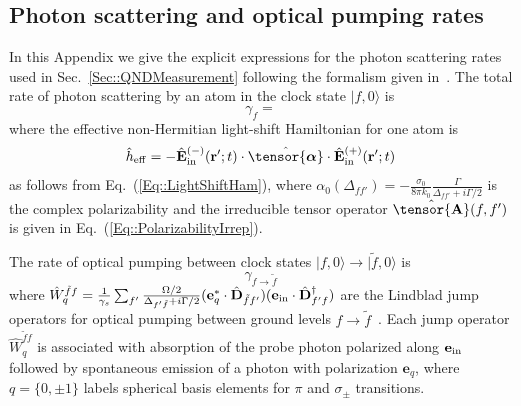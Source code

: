 \documentclass[preprint,aps,pra,onecolumn,superscriptaddress]{revtex4-1} %
\def\bra#1{\langle{#1}\rvert}%
\def\ket#1{\lvert{#1}\rangle}%
\newcommand{\erf}[1]{Eq.~(\ref{#1})}
\newcommand{\mbf}[1]{\mathbf{#1}}
\newcommand{\poltens}{\hat{\tensor{\boldsymbol{\alpha}}}}
\newcommand{\charpol}{\alpha_0(\Delta_{f\!f'})}
\begin{document}
\begin{appendix}
\section{Photon scattering and optical pumping rates} \label{Appendix::Rates}

In this Appendix we give the explicit expressions for the photon scattering rates used in Sec.~\ref{Sec::QNDMeasurement} following the formalism given in~\cite{deutsch_quantum_2010}.  The total rate of photon scattering by an atom in the clock state $\ket{f,0}$ is
	\begin{equation}\label{Eq::gammaf}
		\gamma_{f}=
	\end{equation}
where the effective non-Hermitian light-shift Hamiltonian for one atom is
\begin{align}
\hat{h}_{\rm eff} = - \hat{\mathbf{E}}^{(-)}_{\rm in}(\mathbf{r}' ; t ) \cdot \poltens \cdot \hat{\mathbf{E}}^{(+)}_{\rm in}(\mathbf{r}' ;t )
\end{align}
as follows from \erf{Eq::LightShiftHam}, where $\charpol = -\frac{\sigma_0}{8\pi k_0}\frac{\Gamma}{\Delta_{ff'}+i\Gamma/2}$ is the complex polarizability and the irreducible tensor operator $ \hat{\tensor{\mbf{A}}}(f,f') $ is given in \erf{Eq::PolarizabilityIrrep}.


The rate of optical pumping between clock states $\ket{f,0} \rightarrow \ket{\tilde{f},0}$ is
	\begin{equation}\label{Eq::gammaff}
		\gamma_{f \rightarrow \tilde{f} }
	\end{equation}
where $ \hat{W}_q^{\tilde{f}f} = \frac{1}{\gamma_s}\sum_{f'}\frac{\Omega/2}{\Delta_{f'\tilde{f}}+i\Gamma/2}(\mathbf{e}_q^*\cdot\hat{\mathbf{D}}_{\tilde{f} f'} )(\mathbf{e}_{\rm in}\cdot \hat{\mathbf{D}}^\dagger_{f'f} ) $ are the Lindblad jump operators for optical pumping between ground levels $ f\rightarrow \tilde{f} $~\cite{deutsch_quantum_2010}.
Each jump operator $\hat{W}_q^{\tilde{f}f}$ is associated with absorption of the probe photon polarized along $ \mathbf{e}_{\rm in} $ followed by spontaneous emission of a photon with polarization $ \mathbf{e}_q $, where $q= \{0,\pm 1\}$ labels spherical basis elements for $\pi$ and $ \sigma_\pm$ transitions.


\end{appendix}
\end{document}
